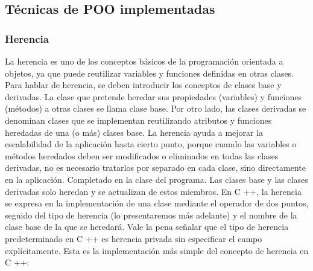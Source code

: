 \documentclass[conference]{IEEEtran}
\newcommand\tab[1][1cm]{\hspace*{#1}}
\begin{document}
        
    \subsection{Técnicas de POO implementadas}

        \subsubsection{Herencia}
        La herencia es uno de los conceptos básicos de la programación orientada a objetos, ya que puede reutilizar variables y funciones definidas en otras clases. Para hablar de herencia, se deben introducir los conceptos de clases base y derivadas. La clase que pretende heredar sus propiedades (variables) y funciones (métodos) a otras clases se llama clase base. Por otro lado, las clases derivadas se denominan clases que se implementan reutilizando atributos y funciones heredadas de una (o más) clases base. La herencia ayuda a mejorar la escalabilidad de la aplicación hasta cierto punto, porque cuando las variables o métodos heredados deben ser modificados o eliminados en todas las clases derivadas, no es necesario tratarlos por separado en cada clase, sino directamente en la aplicación. Completado en la clase del programa. Las clases base y las clases derivadas solo heredan y se actualizan de estos miembros.
        \newline
        \newline
        \newline
        \tab[0.55cm] En C ++, la herencia se expresa en la implementación de una clase mediante el operador de dos puntos, seguido del tipo de herencia (lo presentaremos más adelante) y el nombre de la clase base de la que se heredará. Vale la pena señalar que el tipo de herencia predeterminado en C ++ es herencia privada sin especificar el campo explícitamente. Esta es la implementación más simple del concepto de herencia en C ++:
\end{document}
